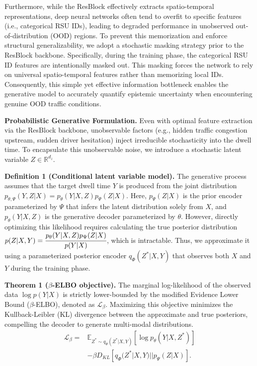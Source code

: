 \documentclass[journal]{IEEEtran}
\begin{document}
Furthermore, while the ResBlock effectively extracts spatio-temporal representations, deep neural networks often tend to overfit to specific features (i.e., categorical RSU IDs), leading to degraded performance in unobserved out-of-distribution (OOD) regions. To prevent this memorization and enforce structural generalizability, we adopt a stochastic masking strategy prior to the ResBlock backbone. Specifically, during the training phase, the categorical RSU ID features are intentionally masked out. This masking forces the network to rely on universal spatio-temporal features rather than memorizing local IDs. Consequently, this simple yet effective information bottleneck enables the generative model to accurately quantify epistemic uncertainty when encountering genuine OOD traffic conditions.

\textbf{Probabilistic Generative Formulation.}
Even with optimal feature extraction via the ResBlock backbone, unobservable factors (e.g., hidden traffic congestion upstream, sudden driver hesitation) inject irreducible stochasticity into the dwell time.
To encapsulate this unobservable noise, we introduce a stochastic latent variable $Z\in \mathbb{R}^{d_{z}}$.

\textbf{Definition 1 (Conditional latent variable model).}
The generative process assumes that the target dwell time $Y$ is produced from the joint distribution $p_{\theta, \Psi}(Y,Z|X)=p_{\theta}(Y|X,Z)p_{\Psi}(Z|X)$.
Here, $p_{\Psi}(Z|X)$ is the prior encoder parameterized by $\Psi$ that infers the latent distribution solely from $X$, and $p_{\theta}(Y|X,Z)$ is the generative decoder parameterized by $\theta$.
However, directly optimizing this likelihood requires calculating the true posterior distribution $p(Z|X,Y)=\cfrac{p_{\theta}(Y|X,Z)p_{\Psi}(Z|X)}{p(Y|X)}$, which is intractable.
Thus, we approximate it using a parameterized posterior encoder $q_{\Phi}(Z^{*}|X,Y)$ that observes both $X$ and $Y$ during the training phase.

\textbf{Theorem 1 ($\beta$-ELBO objective).}
The marginal log-likelihood of the observed data $\log p(Y|X)$ is strictly lower-bounded by the modified Evidence Lower Bound ($\beta$-ELBO), denoted as $\mathcal{L}_{\beta}$.
Maximizing this objective minimizes the Kullback-Leibler (KL) divergence between the approximate and true posteriors, compelling the decoder to generate multi-modal distributions.
\begin{equation}\begin{split}
    \mathcal{L}_{\beta}=&\mathbb{E}_{Z^{*}\sim q_{\Phi}(Z^{*}|X,Y)} \left[ \log p_{\theta}(Y|X,Z^{*})  \right]\\
    & - \beta D_{KL} \left[ q_{\Phi}(Z^{*}|X,Y)||p_{\Psi}(Z|X)\right].
\end{split}\end{equation}
\end{document}
